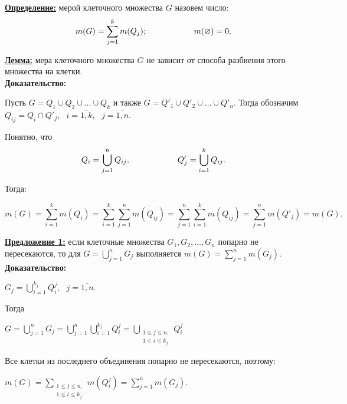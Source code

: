 \documentclass[a4paper,12pt]{article} %
\begin{document}
	\underline{\textbf{Определение:}} мерой клеточного множества $G$ назовем число:
	\begin{equation*}
		m(G) = \sum\limits_{j = 1}^{k} m(Q_j); \hspace{20mm} m(\varnothing) = 0.
	\end{equation*}
	
	\underline{\textbf{Лемма:}} мера клеточного множества $G$ не зависит от способа разбиения этого множества на клетки.\\
	
	\textbf{Доказательство:}
	
	Пусть $G = Q_1 \cup Q_2 \cup \ldots \cup Q_k$ и также $G = Q'_1 \cup Q'_2 \cup \ldots \cup Q'_n$. Тогда обозначим $Q_{ij} = Q_i \cap Q'_j, \text{ } i = \overline{1, k}, \text{ } j = \overline{1, n}.$
	
	Понятно, что 
	\begin{equation*}
		Q_i = \bigcup_{j = 1}^n Q_{ij}, \hspace{20mm} Q'_j = \bigcup_{i = 1}^k Q_{ij}.
	\end{equation*}
	
	Тогда:
	
	\begin{equation*}
		m(G) =  \sum\limits_{i = 1}^{k} m(Q_i) = \sum\limits_{i = 1}^{k} \sum\limits_{j = 1}^{n} m(Q_{ij}) = \sum\limits_{j = 1}^{n} \sum\limits_{i = 1}^{k} m(Q_{ij}) = \sum\limits_{j = 1}^{n} m(Q'_j) = m(G).
	\end{equation*}
	
	\underline{\textbf{Предложение 1:}} если клеточные множества $G_1, G_2, \ldots, G_n$ попарно не пересекаются, то для $G = \bigcup\limits_{j = 1}^n G_j$ выполняется $m(G) = \sum\limits_{j = 1}^n m(G_j)$.\\
	
	\textbf{Доказательство:}
	
	$G_j = \bigcup\limits_{i = 1}^{k_j} Q_i^j, \text{ } j = \overline{1, n}.$
	
	Тогда
	
	$G = \bigcup\limits_{j = 1}^n G_j = \bigcup\limits_{j = 1}^n \bigcup\limits_{i = 1}^{k_j} Q_i^j = \bigcup\limits_{\substack{1 \leqslant j \leqslant n,\\ 1\leqslant i \leqslant k_j}} Q_i^j$
	
	Все клетки из последнего объединения попарно не пересекаются, поэтому:
	
	$m(G) = \sum\limits_{\substack{1 \leqslant j \leqslant n,\\ 1\leqslant i \leqslant k_j}} m(Q_i^j) = \sum\limits_{j = 1}^n m(G_j)$.
	
\end{document}
